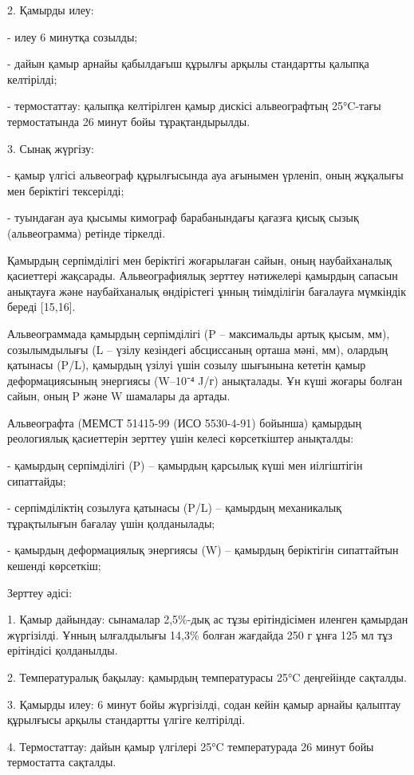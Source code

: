 \begin{multicols}{2}
2. Қамырды илеу:

- илеу 6 минутқа созылды;

- дайын қамыр арнайы қабылдағыш құрылғы арқылы стандартты қалыпқа
келтірілді;

- термостаттау: қалыпқа келтірілген қамыр дискісі альвеографтың
25°C-тағы термостатында 26 минут бойы тұрақтандырылды.

3. Сынақ жүргізу:

- қамыр үлгісі альвеограф құрылғысында ауа ағынымен үрленіп, оның
жұқалығы мен беріктігі тексерілді;

- туындаған ауа қысымы кимограф барабанындағы қағазға қисық сызық
(альвеограмма) ретінде тіркелді.

Қамырдың серпімділігі мен беріктігі жоғарылаған сайын, оның
наубайханалық қасиеттері жақсарады. Альвеографиялық зерттеу нәтижелері
қамырдың сапасын анықтауға және наубайханалық өндірістегі ұнның
тиімділігін бағалауға мүмкіндік береді {[}15,16{]}.

Альвеограммада қамырдың серпімділігі (P -- максимальды артық қысым, мм),
созылымдылығы (L -- үзілу кезіндегі абсциссаның орташа мәні, мм),
олардың қатынасы (P/L), қамырдың үзілуі үшін созылу шығынына кететін
қамыр деформациясының энергиясы (W--10⁻⁴ J/г) анықталады. Ұн күші жоғары
болған сайын, оның P және W шамалары да артады.

Альвеографта (МЕМСТ 51415-99 (ИСО 5530-4-91) бойынша) қамырдың
реологиялық қасиеттерін зерттеу үшін келесі көрсеткіштер анықталды:

- қамырдың серпімділігі (P) -- қамырдың қарсылық күші мен иілгіштігін
сипаттайды;

- серпімділіктің созылуға қатынасы (P/L) -- қамырдың механикалық
тұрақтылығын бағалау үшін қолданылады;

- қамырдың деформациялық энергиясы (W) -- қамырдың беріктігін
сипаттайтын кешенді көрсеткіш;

Зерттеу әдісі:

1. Қамыр дайындау: сынамалар 2,5\%-дық ас тұзы ерітіндісімен иленген
қамырдан жүргізілді. Ұнның ылғалдылығы 14,3\% болған жағдайда 250 г
ұнға 125 мл тұз ерітіндісі қолданылды.

2. Температуралық бақылау: қамырдың температурасы 25°C деңгейінде
сақталды.

3. Қамырды илеу: 6 минут бойы жүргізілді, содан кейін қамыр арнайы
қалыптау құрылғысы арқылы стандартты үлгіге келтірілді.

4. Термостаттау: дайын қамыр үлгілері 25°C температурада 26 минут бойы
термостатта сақталды.


\end{multicols}
